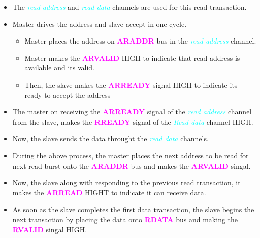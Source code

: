 \documentclass{article}
\newcommand{\chFormat}[1]{\emph{\textcolor{cyan}{#1}}}
\newcommand{\AXISignals}[1]{\textbf{\textcolor{magenta}{#1}}}
\begin{document}
\begin{itemize}
    \item The \chFormat{read address} and \chFormat{read data} channels are used for this read transaction.
    \item Master drives the address and slave accept in one cycle.
    \begin{itemize}
        \item Master places the address on \AXISignals{ARADDR} bus in the \chFormat{read address} channel.
        \item Master makes the \AXISignals{ARVALID} HIGH to indicate that read address is available and its valid.
        \item Then, the slave makes the \AXISignals{ARREADY} signal HIGH to indicate its ready to accept the address
    \end{itemize} 
    \item The master on receiving the \AXISignals{ARREADY} signal of the \chFormat{read address} channel from the slave, makes the \AXISignals{RREADY} signal of the \chFormat{Read data} channel HIGH.
    \item Now, the slave sends the data throught the \chFormat{read data} channels.
    \item During the above process, the master places the next address to be read for next read burst onto the \AXISignals{ARADDR} bus and makes the \AXISignals{ARVALID} singal.
    \item Now, the slave along with responding to the previous read transaction, it makes the \AXISignals{ARREAD} HIGHT to indicate it can receive data.
    \item As soon as the slave completes the first data transaction, the slave begins the next transaction by placing the data onto \AXISignals{RDATA} bus and making the \AXISignals{RVALID} singal HIGH.
\end{itemize}
\end{document}
